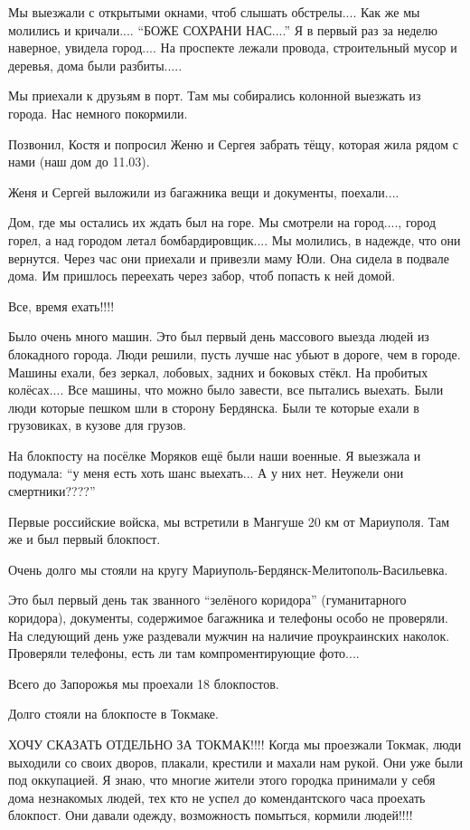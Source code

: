 Мы выезжали с открытыми окнами, чтоб слышать обстрелы.... Как же мы молились и
кричали.... \enquote{БОЖЕ СОХРАНИ НАС....} Я в первый раз за неделю наверное, увидела
город.... На проспекте лежали провода, строительный мусор и деревья, дома были
разбиты.....

Мы приехали к друзьям в порт. Там мы собирались колонной выезжать из города.
Нас немного покормили. 

Позвонил, Костя и попросил Женю и Сергея забрать тёщу, которая жила рядом с
нами (наш дом до 11.03). 

Женя и Сергей выложили из багажника вещи и документы, поехали....

Дом, где мы остались их ждать был на горе. Мы смотрели на город...., город горел,
а над городом летал бомбардировщик.... Мы молились, в надежде, что они вернутся.
Через час они приехали и привезли маму Юли. Она сидела в подвале дома. Им
пришлось переехать через забор, чтоб попасть к ней домой. 

Все, время ехать!!!!

Было очень много машин. Это был первый день массового выезда людей из
блокадного города. Люди решили, пусть лучше нас убьют в дороге, чем в городе.
Машины ехали, без зеркал, лобовых, задних и боковых стёкл. На пробитых
колёсах.... Все машины, что можно было завести, все пытались выехать. Были люди
которые пешком шли в сторону Бердянска. Были те которые ехали в грузовиках, в
кузове для грузов.

На блокпосту на посёлке Моряков ещё были наши военные. Я выезжала и подумала:
\enquote{у меня есть хоть шанс выехать... А у них нет. Неужели они смертники????}

Первые российские войска, мы встретили в Мангуше 20 км от Мариуполя. Там же и
был первый блокпост. 

Очень долго мы стояли на кругу Мариуполь-Бердянск-Мелитополь-Васильевка. 

Это был первый день так званного \enquote{зелёного коридора} (гуманитарного коридора),
документы, содержимое багажника и телефоны особо не проверяли. На следующий
день уже раздевали мужчин на наличие проукраинских наколок. Проверяли телефоны,
есть ли там компроментирующие фото....

Всего до Запорожья мы проехали 18 блокпостов. 

Долго стояли на блокпосте в Токмаке.

ХОЧУ СКАЗАТЬ ОТДЕЛЬНО ЗА ТОКМАК!!!! Когда мы проезжали Токмак, люди выходили со
своих дворов, плакали, крестили и махали нам рукой. Они уже были под
оккупацией. Я знаю, что многие жители этого городка принимали у себя дома
незнакомых людей, тех кто не успел до комендантского часа проехать блокпост.
Они давали одежду, возможность помыться, кормили людей!!!! 

